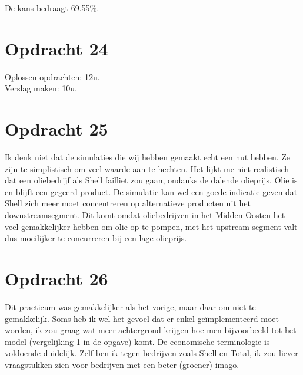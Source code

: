 \documentclass[11pt,a4paper]{article}
\begin{document}
De kans bedraagt 69.55\%.



\section*{Opdracht 24}

Oplossen opdrachten: 12u.\\
Verslag maken: 10u.

\section*{Opdracht 25}

Ik denk niet dat de simulaties die wij hebben gemaakt echt een nut hebben. Ze zijn te simplistisch om veel waarde aan te hechten. 
Het lijkt me niet realistisch dat een oliebedrijf als Shell failliet zou gaan, ondanks de dalende olieprijs. Olie is en blijft een gegeerd product.
De simulatie kan wel een goede indicatie geven dat Shell zich meer moet concentreren op alternatieve producten uit het downstreamsegment. 
Dit komt omdat oliebedrijven in het Midden-Oosten het veel gemakkelijker hebben om olie op te pompen, met het upstream segment valt dus moeilijker te concurreren bij een lage olieprijs.

\section*{Opdracht 26}
Dit practicum was gemakkelijker als het vorige, maar daar om niet te gemakkelijk. Soms heb ik wel het gevoel dat er enkel geïmplementeerd moet worden, ik zou graag wat meer achtergrond krijgen hoe men bijvoorbeeld tot het model (vergelijking 1 in de opgave) komt.
De economische terminologie is voldoende duidelijk.
Zelf ben ik tegen bedrijven zoals Shell en Total, ik zou liever vraagstukken zien voor bedrijven met een beter (groener) imago.
\end{document}
